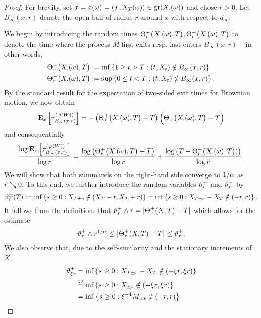 \begin{proof}
  For brevity, set $x=x(\go)=(T,X_T(\go))\in\gr(X_\cdot(\go))$ and chose $r>0$. Let $B_\infty(x,r)$ denote the open ball of radius $r$ around $x$ with respect to $d_\infty$.
  
  We begin by introducing the random times 
  $\gT^+_r\big(X_\cdot(\go),T\big),\gT^-_r\big(X_\cdot(\go),T\big)$ to denote the time where the process $M$ first exits resp. last enters $B_\infty(x,r)$ -- in other words,
  \begin{align}\label{eq:Theta}
    \gT^+_r\big(X_\cdot(\go),T\big)
    &:=\inf\left\{1\geq t>T:(t,X_t)\notin B_\infty(x,r)\right\}\notag\\
    \gT^-_r\big(X_\cdot(\go),T\big)
    &:=\sup\left\{0\leq t<T:(t,X_t)\notin B_\infty(x,r)\right\}.
  \end{align}
  By the standard result for the expectation of two-sided exit times for Brownian motion, we now obtain 
  \[
    \PTEp{\tau_{B_\infty(x,r)}^{(\gp(W))}}{x}
    =-\left(\gT^+_r\big(X_\cdot(\go),T\big)-T\right)
      \Big(\gT^-_r\big(X_\cdot(\go),T\big)-T\Big)
  \]    
  and consequentially
  \begin{equation}\label{eq:sumoflogs}
    \frac{\log \PTEp{\tau_{B_\infty(x,r)}^{(\gp(W))}}{x}}{\log r}
    =\frac{\log \big(\gT^+_r\big(X_\cdot(\go),T\big)-T\big)}{\log r}
     +\frac{\log \big(T-\gT^-_r\big(X_\cdot(\go),T\big))\big)}{\log r}.
  \end{equation}
  We will show that both summands on the right-hand side converge to 
  $1/\ga$ as $r\searrow 0$. To this end, we further introduce the random variables $\gvt_r^+$ and $\gvt_r^-$ by 
  \[
    \gvt_r^\pm(T)
      :=\inf\left\{s\geq0:X_{T\pm s}\notin(X_T-r,X_T+r)\right\}
       =\inf\left\{s\geq0:X_{T\pm s}-X_T\notin(-r,r)\right\}.
  \]
  It follows from the definitions that 
  $\gvt_r^\pm\wedge r=\left|\gT^\pm_r(X,T)-T\right|$
  which allows for the estimate 
  \begin{equation}\label{eq:gvtest1}
    \gvt_r^\pm\wedge r^{1/\ga}
    \leq \left|\gT^\pm_r(X,T)-T\right|
    \leq \gvt_r^{\pm}.
  \end{equation}
  We also observe that, due to the self-similarity and the stationary increments of $X$, 
  \begin{align*}
    \gvt_{\xi r}^\pm
     &=\inf\left\{s\geq0:X_{T\pm s}-X_T\notin(-\xi r,\xi r)\right\}\\
     &\stackrel{\cD}{=}\inf\left\{s\geq0:X_{\pm s}\notin
         (-\xi r,\xi r)\right\}\\
     &=\inf\left\{s\geq0:\xi^{-1}M_{\pm s}\notin(-r,r)\right\}\\

\end{align*}
\end{proof}
